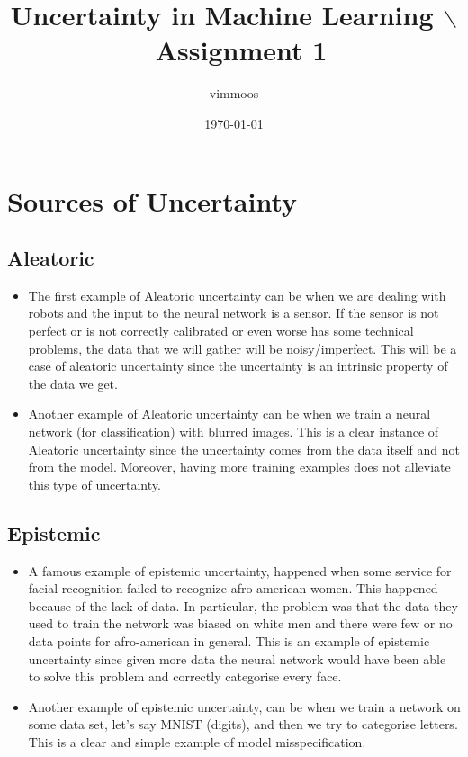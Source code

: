 \documentclass[11pt]{article}
\author{vimmoos}
\date{\today}
\title{Uncertainty in Machine Learning $\backslash$\ Assignment 1}
\begin{document}
\maketitle
\tableofcontents


\section{Sources of Uncertainty}
\label{sec:org4e57f4d}
\subsection{Aleatoric}
\label{sec:org4d0b1e3}
\begin{itemize}
\item The first example of Aleatoric uncertainty can be when we are
dealing with robots and the input to the neural network is a sensor.
If the sensor is not perfect or is not correctly calibrated or even
worse has some technical problems, the data that we will gather will
be noisy/imperfect. This will be a case of aleatoric uncertainty
since the uncertainty is an intrinsic property of the data we get.

\item Another example of Aleatoric uncertainty can be when we train a
neural network (for classification) with blurred images. This is a
clear instance of Aleatoric uncertainty since the uncertainty comes
from the data itself and not from the model. Moreover, having more
training examples does not alleviate this type of uncertainty.
\end{itemize}

\subsection{Epistemic}
\label{sec:org97222da}
\begin{itemize}
\item A famous example of epistemic uncertainty, happened when some service
for facial recognition failed to recognize afro-american women. This
happened because of the lack of data. In particular, the problem was
that the data they used to train the network was biased on white men
and there were few or no data points for afro-american in
general. This is an example of epistemic uncertainty since given
more data the neural network would have been able to solve this
problem and correctly categorise every face.

\item Another example of epistemic uncertainty, can be when we train a
network on some data set, let's say MNIST (digits), and then we try
to categorise letters. This is a clear and simple example of
model misspecification.
\end{itemize}
\end{document}
